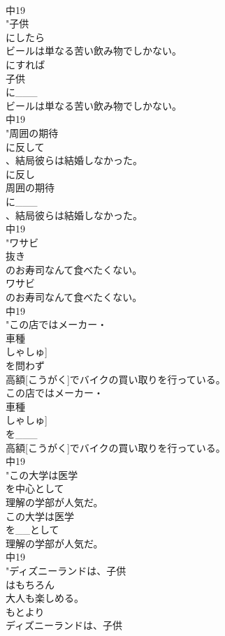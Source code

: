 \documentclass[8pt]{extreport}
\begin{document}
\begin{CJK}{UTF8}{min}
\\	中19
\\	"子供
\\	にしたら
\\	ビールは単なる苦い飲み物でしかない。
\\	にすれば
\\	子供
\\	に___
\\	ビールは単なる苦い飲み物でしかない。
\\	中19
\\	"周囲の期待
\\	に反して
\\	、結局彼らは結婚しなかった。
\\	に反し
\\	周囲の期待
\\	に___
\\	、結局彼らは結婚しなかった。
\\	中19
\\	"ワサビ
\\	抜き
\\	のお寿司なんて食べたくない。
\\	ワサビ
\\	のお寿司なんて食べたくない。
\\	中19
\\	"この店ではメーカー・
\\	車種
\\	しゃしゅ]
\\	を問わず
\\	高額[こうがく]でバイクの買い取りを行っている。
\\	この店ではメーカー・
\\	車種
\\	しゃしゅ]
\\	を___
\\	高額[こうがく]でバイクの買い取りを行っている。
\\	中19
\\	"この大学は医学
\\	を中心として
\\	理解の学部が人気だ。
\\	この大学は医学
\\	を__として
\\	理解の学部が人気だ。
\\	中19
\\	"ディズニーランドは、子供
\\	はもちろん
\\	大人も楽しめる。
\\	もとより
\\	ディズニーランドは、子供

\end{CJK}
\end{document}
